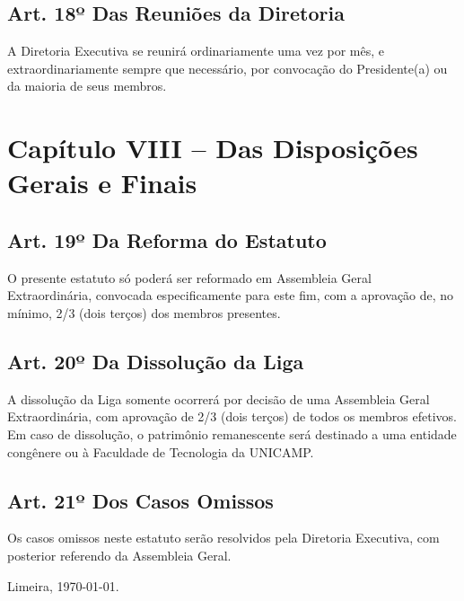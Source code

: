 \documentclass[12pt, a4paper]{article}
\begin{document}
\subsection{Art. 18º Das Reuniões da Diretoria}
A Diretoria Executiva se reunirá ordinariamente uma vez por mês, e extraordinariamente sempre que necessário, por convocação do Presidente(a) ou da maioria de seus membros.


\section{Capítulo VIII – Das Disposições Gerais e Finais}


\subsection{Art. 19º Da Reforma do Estatuto}
O presente estatuto só poderá ser reformado em Assembleia Geral Extraordinária, convocada especificamente para este fim, com a aprovação de, no mínimo, 2/3 (dois terços) dos membros presentes.

\subsection{Art. 20º Da Dissolução da Liga}
A dissolução da Liga somente ocorrerá por decisão de uma Assembleia Geral Extraordinária, com aprovação de 2/3 (dois terços) de todos os membros efetivos. Em caso de dissolução, o patrimônio remanescente será destinado a uma entidade congênere ou à Faculdade de Tecnologia da UNICAMP.

\subsection{Art. 21º Dos Casos Omissos}
Os casos omissos neste estatuto serão resolvidos pela Diretoria Executiva, com posterior referendo da Assembleia Geral.

\bigskip
\bigskip
\begin{center}
    Limeira, \today.
\end{center}
\end{document}
